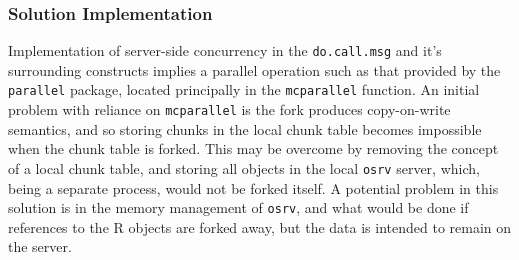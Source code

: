 \subsubsection{Solution Implementation}

Implementation of server-side concurrency in the
\texttt{do.call.msg} and it's surrounding constructs implies a
parallel operation such as that provided by the \texttt{parallel} package,
located principally in the \texttt{mcparallel} function.
An initial problem with reliance on \texttt{mcparallel} is the
fork produces copy-on-write semantics, and so storing chunks in the local chunk
table becomes impossible when the chunk table is forked.
This may be overcome by removing the concept of a local chunk table, and
storing all objects in the local \texttt{osrv} server, which, being a separate
process, would not be forked itself. 
A potential problem in this solution is in the memory management of
\texttt{osrv}, and what would be done if references to the R objects are forked
away, but the data is intended to remain on the server.
